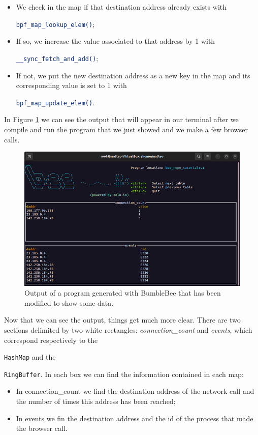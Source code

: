 \begin{itemize}
	\item 
		We check in the map if that destination address already exists with \raggedright\colorbox{backcolour}{\lstinline[style=commandline, language=bash]|bpf_map_lookup_elem()|};
	\item 
		If so, we increase the value associated to that address by 1 with \raggedright\colorbox{backcolour}{\lstinline[style=commandline, language=bash]|__sync_fetch_and_add()|};
	\item 
		If not, we put the new destination address as a new key in the map and its corresponding value is set to 1 with \raggedright\colorbox{backcolour}{\lstinline[style=commandline, language=bash]|bpf_map_update_elem()|}.
\end{itemize}

In Figure \ref{fig:bee_complete_program_output} we can see the output that will appear in our terminal after we compile and run the program that we just showed and we make a few browser calls.

\begin{figure}[h]
	\centering
	\includegraphics[width=0.7\linewidth]{images/LinuxDevelopment/bee_repo_tut_display.png}
	\caption{Output of a program generated with BumbleBee that has been modified to show some data.}
	\label{fig:bee_complete_program_output}
\end{figure}

Now that we can see the output, things get much more clear.
There are two sections delimited by two white rectangles: \textit{connection\_count} and \textit{events}, which correspond respectively to the \raggedright\colorbox{backcolour}{\lstinline[style=commandline, language=bash]|HashMap|} and the \raggedright\colorbox{backcolour}{\lstinline[style=commandline, language=bash]|RingBuffer|}.
In each box we can find the information contained in each map:

\begin{itemize}
	\item 
		In connection\_count we find the destination address of the network call and the number of times this address has been reached;
	\item 
		In events we fin the destination address and the id of the process that made the browser call.
\end{itemize}

